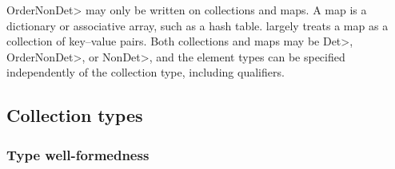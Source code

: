 \<OrderNonDet> may only be written on collections and maps.
A map is a dictionary or associative array, such as a hash table.
\OurTypeSystem largely treats a map as a collection of key--value pairs.
Both collections and maps may be \<Det>, \<OrderNonDet>, or \<NonDet>, and
the element types can be specified independently of the collection type,
including qualifiers.



\subsection{Collection types}\label{collection-rules}

\subsubsection{Type well-formedness}


